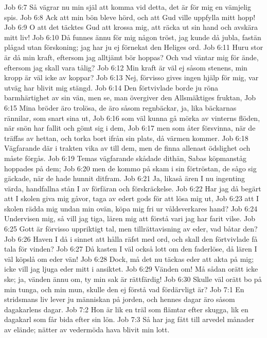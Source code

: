 Job 6:7  Så vägrar nu min själ att komma vid detta, det är för mig en vämjelig spis.
Job 6:8  Ack att min bön bleve hörd, och att Gud ville uppfylla mitt hopp!
Job 6:9  O att det täcktes Gud att krossa mig, att räcka ut sin hand och avskära mitt liv!
Job 6:10  Då funnes ännu för mig någon tröst, jag kunde då jubla, fastän plågad utan förskoning; jag har ju ej förnekat den Heliges ord.
Job 6:11  Huru stor är då min kraft, eftersom jag alltjämt bör hoppas? Och vad väntar mig för ände, eftersom jag skall vara tålig?
Job 6:12  Min kraft är väl ej såsom stenens, min kropp är väl icke av koppar?
Job 6:13  Nej, förvisso gives ingen hjälp för mig, var utväg har blivit mig stängd.
Job 6:14  Den förtvivlade borde ju röna barmhärtighet av sin vän, men se, man övergiver den Allsmäktiges fruktan,
Job 6:15  Mina bröder äro trolösa, de äro såsom regnbäckar, ja, lika bäckarnas rännilar, som snart sina ut,
Job 6:16  som väl kunna gå mörka av vinterns flöden, när snön har fallit och gömt sig i dem,
Job 6:17  men som åter försvinna, när de träffas av hettan, och torka bort ifrån sin plats, då värmen kommer.
Job 6:18  Vägfarande där i trakten vika av till dem, men de finna allenast ödslighet och måste förgås.
Job 6:19  Temas vägfarande skådade dithän, Sabas köpmanståg hoppades på dem;
Job 6:20  men de kommo på skam i sin förtröstan, de sågo sig gäckade, när de hade hunnit ditfram.
Job 6:21  Ja, likaså ären I nu ingenting värda, handfallna stån I av förfäran och förskräckelse.
Job 6:22  Har jag då begärt att I skolen giva mig gåvor, taga av edert gods för att lösa mig ut,
Job 6:23  att I skolen rädda mig undan min ovän, köpa mig fri ur våldsverkares hand?
Job 6:24  Undervisen mig, så vill jag tiga, lären mig att förstå vari jag har farit vilse.
Job 6:25  Gott är förvisso uppriktigt tal, men tillrättavisning av eder, vad båtar den?
Job 6:26  Haven I då i sinnet att hålla räfst med ord, och skall den förtvivlade få tala för vinden?
Job 6:27  Då kasten I väl också lott om den faderlöse, då lären I väl köpslå om eder vän!
Job 6:28  Dock, må det nu täckas eder att akta på mig; icke vill jag ljuga eder mitt i ansiktet.
Job 6:29  Vänden om! Må sådan orätt icke ske; ja, vänden ännu om, ty min sak är rättfärdig!
Job 6:30  Skulle väl orätt bo på min tunga, och min mun, skulle den ej förstå vad fördärvligt är?
Job 7:1  En stridsmans liv lever ju människan på jorden, och hennes dagar äro såsom dagakarlens dagar.
Job 7:2  Hon är lik en träl som flämtar efter skugga, lik en dagakarl som får bida efter sin lön.
Job 7:3  Så har jag fått till arvedel månader av elände; nätter av vedermöda hava blivit min lott.
